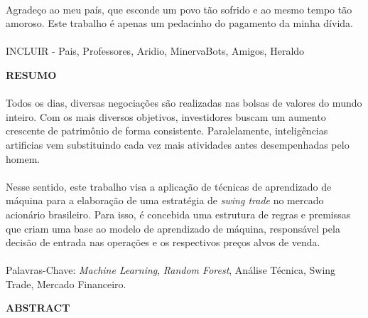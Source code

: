 \paragraph{} Agrade\c{c}o ao meu pa\'is, que esconde um povo t\~ao sofrido e ao mesmo tempo t\~ao amoroso. Este trabalho é apenas um pedacinho do pagamento da minha d\'ivida.

\paragraph{} INCLUIR - Pais, Professores, Aridio, MinervaBots, Amigos, Heraldo

\pagebreak


\begin{center}
\textbf{RESUMO}
\end{center}
      \vspace{0.5cm}

\paragraph{} Todos os dias, diversas negociações são realizadas nas bolsas de valores do mundo inteiro. Com os mais diversos objetivos, investidores buscam um aumento crescente de patrimônio de forma consistente. Paralelamente, inteligências artificias vem substituindo cada vez mais atividades antes desempenhadas pelo homem.

\paragraph{} Nesse sentido, este trabalho visa a aplicação de técnicas de aprendizado de máquina para a elaboração de uma estratégia de \textit{swing trade} no mercado acionário brasileiro. Para isso, é concebida uma estrutura de regras e premissas que criam uma base ao modelo de aprendizado de máquina, responsável pela decisão de entrada nas operações e os respectivos preços alvos de venda.

\paragraph{}
\noindent Palavras-Chave: \textit{Machine Learning}, \textit{Random Forest}, Análise Técnica, Swing Trade, Mercado Financeiro.

\pagebreak


\begin{center}
\textbf{ABSTRACT}
\end{center}
      \vspace{0.5cm}

